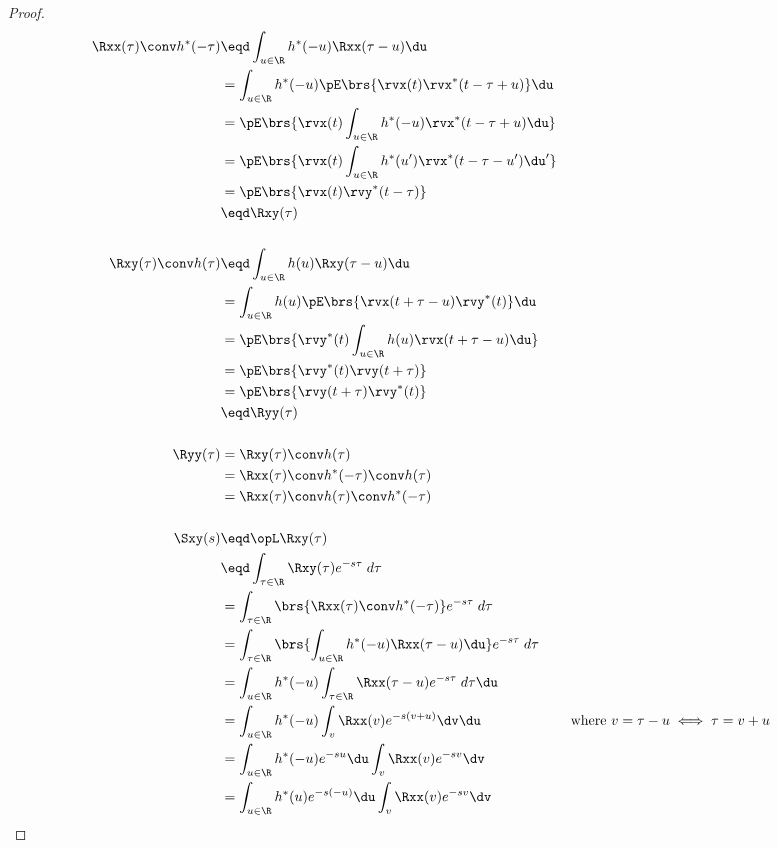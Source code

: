 \begin{proof}
\begin{align*}
   \Rxx(\tau) \conv h^\ast(-\tau)
     &\eqd \int_{u\in\R}h^\ast(-u) \Rxx(\tau-u)\du
   \\&=    \int_{u\in\R}h^\ast(-u) \pE\brs{\rvx(t) \rvx^\ast(t-\tau+u) } \du
   \\&=    \pE\brs{\rvx(t) \int_{u\in\R}h^\ast(-u)  \rvx^\ast(t-\tau+u) \du   }
   \\&=    \pE\brs{\rvx(t) \int_{u\in\R}h^\ast(u^\prime)  \rvx^\ast(t-\tau-u^\prime) \du^\prime   }
   \\&=    \pE\brs{\rvx(t) \rvy^\ast(t-\tau)  }
   \\&\eqd \Rxy(\tau)
\\
\\
   \Rxy(\tau) \conv h(\tau)
     &\eqd \int_{u\in\R}h(u) \Rxy(\tau-u)\du
   \\&=    \int_{u\in\R}h(u) \pE\brs{\rvx(t+\tau-u) \rvy^\ast(t) } \du
   \\&=    \pE\brs{\rvy^\ast(t) \int_{u\in\R}h(u) \rvx(t+\tau-u)  \du }
   \\&=    \pE\brs{\rvy^\ast(t) \rvy(t+\tau) }
   \\&=    \pE\brs{ \rvy(t+\tau) \rvy^\ast(t)}
   \\&\eqd \Ryy(\tau)
\\
\\
   \Ryy(\tau)
     &= \Rxy(\tau) \conv h(\tau)
   \\&= \Rxx(\tau) \conv h^\ast(-\tau) \conv h(\tau)
   \\&= \Rxx(\tau) \conv h(\tau)  \conv h^\ast(-\tau)
\\
\\
  \Sxy(s)
     &\eqd \opL \Rxy(\tau)
   \\&\eqd \int_{\tau\in\R}\Rxy(\tau) e^{-s\tau} \; d\tau
   \\&=    \int_{\tau\in\R}\brs{ \Rxx(\tau) \conv h^\ast(-\tau) } e^{-s\tau} \; d\tau
   \\&=    \int_{\tau\in\R}\brs{ \int_{u\in\R}h^\ast(-u) \Rxx(\tau-u)\du } e^{-s\tau} \; d\tau
   \\&=    \int_{u\in\R}h^\ast(-u) \int_{\tau\in\R}\Rxx(\tau-u)e^{-s\tau} \; d\tau\du
   \\&=    \int_{u\in\R}h^\ast(-u) \int_v \Rxx(v)e^{-s(v+u)} \dv \du
     && \text{where $v=\tau-u\iff \tau=v+u$}
   \\&=    \int_{u\in\R}h^\ast(-u) e^{-su} \du \int_v \Rxx(v)e^{-sv} \dv
   \\&=    \int_{u\in\R}h^\ast(u) e^{-s(-u)} \du \int_v \Rxx(v)e^{-sv} \dv

\end{align*}
\end{proof}
